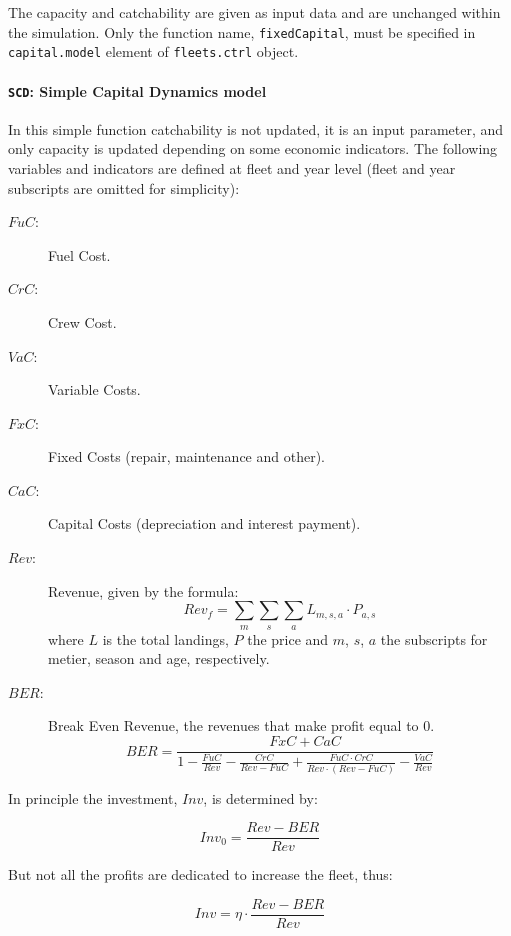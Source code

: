 The capacity and catchability are given as input data and are unchanged within the simulation.
Only the function name, \texttt{fixedCapital},  must be specified in  \texttt{capital.model} element of \texttt{fleets.ctrl}
object.



\paragraph{\texttt{SCD}: Simple Capital Dynamics model} \hspace{0pt} \smallskip

In this simple function catchability is not updated, it is an input parameter, and only
capacity is updated depending on some economic indicators. The following variables and indicators are defined
at fleet and year level (fleet and year subscripts are omitted for simplicity):

\begin{description}
	\item[$FuC$:] Fuel Cost.
	\item[$CrC$:] Crew Cost.
	\item[$VaC$:] Variable Costs.
	\item[$FxC$:] Fixed Costs (repair, maintenance and other).
	\item[$CaC$:] Capital Costs (depreciation and interest payment).
	\item[$Rev$:] Revenue, given by the formula:
		$$Rev_f = \sum_m\sum_s\sum_a L_{m,s,a}\cdot P_{a,s}$$
    \noindent where $L$ is the total landings, $P$ the price and $m$, $s$, $a$ the subscripts for metier, season and age, respectively.
	\item[$BER$:] Break Even Revenue, the revenues that make profit equal to 0.
		$$BER = \frac{FxC+CaC}{1-\frac{FuC}{Rev} - \frac{CrC}{Rev-FuC} + \frac{FuC\cdot CrC}{Rev \cdot (Rev-FuC)} - \frac{VaC}{Rev}}$$
\end{description}

In principle the investment, $Inv$, is determined by:

	$$Inv_0 = \frac{Rev-BER}{Rev}$$

But not all the profits are dedicated to increase the fleet, thus:

	$$Inv = \eta \cdot \frac{Rev-BER}{Rev}$$
	
